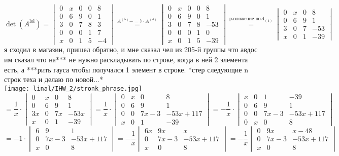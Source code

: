 \documentclass[17pt]{article}
\begin{document}
$$
\det(A^\text{lol}) =
\begin{vmatrix}
   0 & x & 0 & 0 & 8\\
   0 & 6 & 9 & 0 & 1\\
   3 & 0 & 7 & 8 & 3\\
   0 & 0 & 0 & 1 & 7\\
   x & 0 & 1 & 5 & -4
\end{vmatrix}
\overset{A^{(5)}-=7\cdot A^{(4)}}{=}
\begin{vmatrix}
   0 & x & 0 & 0 & 8\\
   0 & 6 & 9 & 0 & 1\\
   3 & 0 & 7 & 8 & -53\\
   0 & 0 & 0 & 1 & 0\\
   x & 0 & 1 & 5 & -39
\end{vmatrix}
\overset{\text{разложение по} A_{(4)}}{=}
\begin{vmatrix}
   0 & x & 0 & 8\\
   0 & 6 & 9 & 1\\
   3 & 0 & 7 & -53\\
   x & 0 & 1 & -39
\end{vmatrix}
$$
я сходил в магазин, пришел обратно, и мне сказал чел из 205-й группы что авдос им сказал что на*** не нужно раскладывать по строке, когда в ней 2 элемента есть, а ***рить гауса чтобы получался 1 элемент в строке. *стер следующие n строк теха и делаю по новой...*
\\
\texttt{[image: linal/IHW\_2/stronk\_phrase.jpg]}
\\
$$
=\frac{1}{x}\cdot
\begin{vmatrix}
   0 & x & 0 & 8\\
   0 & 6 & 9 & 1\\
   3x & 0 & 7x & -53x\\
   x & 0 & 1 & -39
\end{vmatrix}
=\frac{1}{x}\cdot
\begin{vmatrix}
   0 & x & 0 & 8\\
   0 & 6 & 9 & 1\\
   0 & 0 & 7x-3 & -53x+117\\
   x & 0 & 1 & -39
\end{vmatrix}
= -\frac{1}{x}\cdot
\begin{vmatrix}
   x & 0 & 1 & -39\\
   0 & 6 & 9 & 1\\
   0 & 0 & 7x-3 & -53x+117\\
   0 & x & 0 & 8
\end{vmatrix}
$$
$$
= -1\cdot
\begin{vmatrix}
   6 & 9 & 1\\
   0 & 7x-3 & -53x+117\\
   x & 0 & 8
\end{vmatrix}
= -\frac{1}{x}
\begin{vmatrix}
   6x & 9x & x\\
   0 & 7x-3 & -53x+117\\
   x & 0 & 8
\end{vmatrix}
= -\frac{1}{x}
\begin{vmatrix}
   0 & 9x & x-48\\
   0 & 7x-3 & -53x+117\\
   x & 0 & 8
\end{vmatrix}
$$
\end{document}
